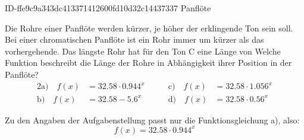 \begin{exercise}
      {ID-ffe9c9a343dc413371412600fd10d32c14437337}
      {Panflöte}
  \ifproblem\problem\par
    Die Rohre einer Panflöte werden kürzer, je höher der
    erklingende Ton sein soll. Bei einer chromatischen
    Panflöte ist ein Rohr immer um  kürzer als
    das vorhergehende. Das längste Rohr hat für den Ton
    C eine Länge von  Welche Funktion
    beschreibt die Länge der Rohre in Abhängigkeit ihrer
    Position in der Panflöte?
    \begin{alignat*}{2}
      \text{a)}\quad f(x)&=\num{32.58}\cdot\num{0.944}^{x} & \qquad
      \text{c)}\quad f(x)&=\num{32.58}\cdot\num{1.056}^{x} \\
      \text{b)}\quad f(x)&=\num{32.58}-\num{5.6}^{x}       & \qquad
      \text{d)}\quad f(x)&=\num{32.58}\cdot\num{0.56}^{x}
    \end{alignat*}
  \fi
  \ifoutcome\outcome\par
    Zu den Angaben der Aufgabenstellung passt nur die
    Funktionsgleichung a), also:
    \begin{equation*}
      f(x)=\num{32.58}\cdot\num{0.944}^{x}
    \end{equation*}
  \fi
\end{exercise}
